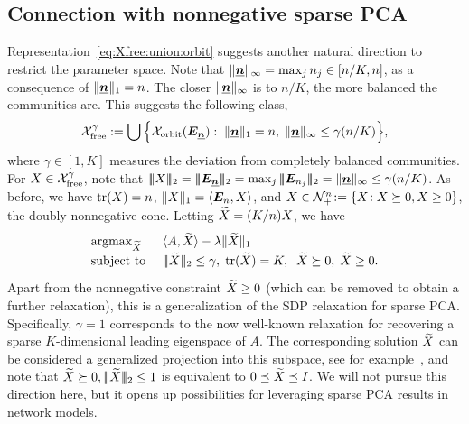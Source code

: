 \subsection{Connection with nonnegative sparse PCA}\label{sec:sparse:PCA} 
Representation~\eqref{eq:Xfree:union:orbit} suggests another natural
direction to restrict the parameter space. Note that $\|{\underline{\bm{n}}}\|_\infty =
\max_j n_j \in [n/K,n]$, as a consequence of $\|{\underline{\bm{n}}}\|_1 = n$. The
closer $\|{\underline{\bm{n}}}\|_\infty$ is to $n/K$, the more balanced the communities
are. This suggests the following class, 
\begin{align}\label{eq:Xfree:gam}
 	\mathcal{X}_{\text{free}}^{\gamma} := \bigcup \Big\{
 	 \mathcal{X}_{\text{orbit}}{(}\bm{E}_{\underline{\bm{n}}}) :\; \|{\underline{\bm{n}}}\|_1 = n,
 		\; \|{\underline{\bm{n}}}\|_\infty \le \gamma (n/K) \Big\},
 \end{align} 
where $\gamma \in [1,K]$ measures the deviation from completely balanced communities. %
For $X \in \mathcal{X}_{\text{free}}^{\gamma}$, note that 
$\mnorm{X}_2 = \mnorm{\onem_\nb}_2 
= \max_j \mnorm{ \onem_{n_j}}_2 
= \|\nb\|_\infty \le \gamma(n/K)$.  As before, we have $\operatorname*{tr}(X) = n$,
$\|X\|_1 = \langle \bm{E}_n,X\rangle$, and 
$X \in \mathcal{N}_+^n \!:= \{X\!: X \succeq 0, X \ge 0\}$, 
the doubly nonnegative cone.  Letting $\widetilde{X} = (K/n) X$, we have %
\begin{align}\label{eq:sPCA:SDP}
\begin{split}
  \def\arraystretch{1.3}
  \begin{array}{ll}
    \argmax_{\Xt} & \ip{A,\Xt} - \lambda\|\Xt\|_1 \\
        \text{subject to } 
        & \mnorm{\Xt}_2 \le \gamma, \; \tr(\Xt) = K, \;\;
        \Xt \succeq 0, \;\Xt \ge 0.
  \end{array}
\end{split}
\end{align}
Apart from the nonnegative constraint $\widetilde{X} \ge 0$ (which can be
removed to obtain a further relaxation), this is a generalization of
the SDP relaxation for  sparse PCA. Specifically, $\gamma = 1$
corresponds to the now well-known relaxation for recovering a sparse
$K$-dimensional leading eigenspace of $A$. The corresponding solution
$\widetilde{X}$ can be considered a generalized projection into this subspace,
see for example~\cite{Vu2013,D'Aspremont2004}, and note that $\widetilde{X}
\succeq 0, |\!|\!|\widetilde{X}|\!|\!|_2 \le 1$ is equivalent to $0 \preceq \widetilde{X}
\preceq  I$.   We will not pursue this direction here, but it opens up
possibilities for leveraging sparse PCA results in network models.  

